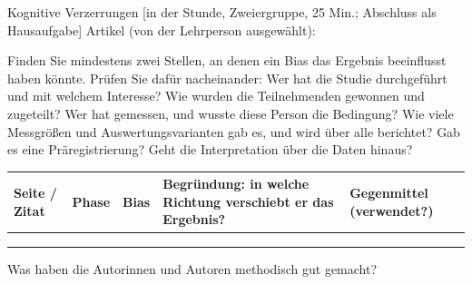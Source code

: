 \begin{uebungsblatt}{Kognitive Verzerrungen}
[in der Stunde, Zweiergruppe, 25 Min.; Abschluss als Hausaufgabe]
Artikel (von der Lehrperson ausgewählt): \hrulefill

Finden Sie mindestens zwei Stellen, an denen ein Bias das Ergebnis
beeinflusst haben könnte. Prüfen Sie dafür nacheinander: Wer hat die
Studie durchgeführt und mit welchem Interesse? Wie wurden die
Teilnehmenden gewonnen und zugeteilt? Wer hat gemessen, und wusste diese
Person die Bedingung? Wie viele Messgrößen und Auswertungsvarianten gab
es, und wird über alle berichtet? Gab es eine Präregistrierung? Geht die
Interpretation über die Daten hinaus?

\begin{center}
\small
\renewcommand{\arraystretch}{2.6}
\begin{tabular}{|p{}|p{}|p{}|p{}|p{}|}
\hline
\textbf{Seite / Zitat} & \textbf{Phase} & \textbf{Bias} & \textbf{Begründung: in welche Richtung verschiebt er das Ergebnis?} & \textbf{Gegenmittel (verwendet?)} \\
\hline
 & & & & \\ \hline
 & & & & \\ \hline
 & & & & \\ \hline
\end{tabular}
\end{center}

Was haben die Autorinnen und Autoren methodisch gut gemacht?
\end{uebungsblatt}

